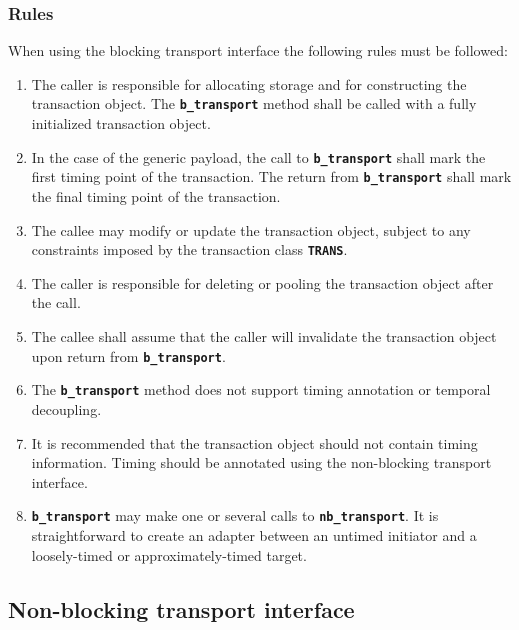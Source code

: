 {\subsubsection{Rules}
When using the blocking transport interface the following rules must be followed:
\begin{enumerate}
	\item The caller is responsible for allocating storage and for constructing the transaction object. 
	The \texttt{\textbf{b\_transport}} method shall be called with a fully initialized transaction object.
	\item In the case of the generic payload, the call to \texttt{\textbf{b\_transport}} shall mark the first timing point of the transaction.
	The return from \texttt{\textbf{b\_transport}} shall mark the final timing point of the transaction.
	\item The callee may modify or update the transaction object, subject to any constraints imposed by the transaction class \texttt{\textbf{TRANS}}.
	\item The caller is responsible for deleting or pooling the transaction object after the call.
	\item The callee shall assume that the caller will invalidate the transaction object upon return from \texttt{\textbf{b\_transport}}.
	\item The \texttt{\textbf{b\_transport}} method does not support timing annotation or temporal decoupling.
	\item It is recommended that the transaction object should not contain timing information. 
	Timing should be annotated using the non-blocking transport interface.
	\item \texttt{\textbf{b\_transport}} may make one or several calls to \texttt{\textbf{nb\_transport}}. 
	It is straightforward to create an adapter between an untimed initiator and a loosely-timed or approximately-timed target.
\end{enumerate}
}

\subsection{Non-blocking transport interface}


